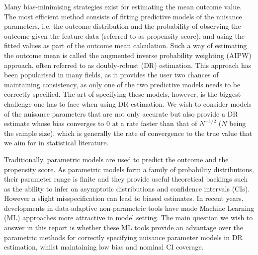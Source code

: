 \documentclass[12pt,twoside]{article}
\begin{document}
Many bias-minimising strategies exist for estimating the mean outcome value. The most efficient method consists of fitting predictive models of the nuisance parameters, i.e. the outcome distribution and the probability of observing the outcome given the feature data (referred to as propensity score), and using the fitted values as part of the outcome mean calculation. Such a way of estimating the outcome mean is called the augmented inverse probability weighting (AIPW) approach, often referred to as doubly-robust (DR) estimation. This approach has been popularised in many fields, as it provides the user two chances of maintaining consistency, as only one of the two predictive models needs to be correctly specified. The art of specifying these models, however, is the biggest challenge one has to face when using DR estimation. We wish to consider models of the nuisance parameters that are not only accurate but also provide a DR estimate whose bias converges to 0 at a rate faster than that of $N^{-1/2}$ ($N$ being the sample size), which is generally the rate of convergence to the true value that we aim for in statistical literature.

Traditionally, parametric models are used to predict the outcome and the propensity score. As parametric models form a family of probability distributions, their parameter range is finite and they provide useful theoretical backings such as the ability to infer on asymptotic distributions and confidence intervals (CIs). However a slight misspecification can lead to biased estimates. In recent years, developments in data-adaptive non-parametric tools have made Machine Learning (ML) approaches more attractive in model setting. The main question we wish to answer in this report is whether these ML tools provide an advantage over the parametric methods for correctly specifying nuisance parameter models in DR estimation, whilst maintaining low bias and nominal CI coverage.
 
\end{document}
